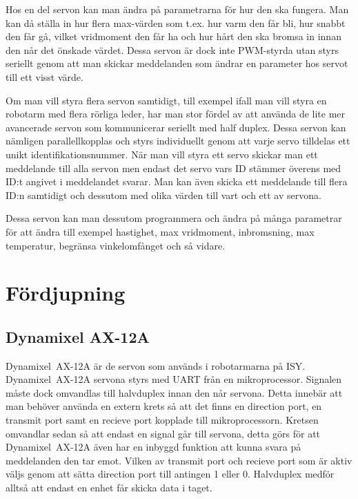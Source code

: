 \documentclass[a4paper,12pt]{article}
\begin{document}
Hos en del servon kan man ändra på parametrarna för hur den ska fungera. Man kan då ställa in hur flera max-värden som t.ex. hur varm den får bli, hur snabbt den får gå, vilket vridmoment den får ha och hur hårt den ska bromsa in innan den når det önskade värdet. Dessa servon är dock inte PWM-styrda utan styrs seriellt genom att man skickar meddelanden som ändrar en parameter hos servot till ett visst värde. 

Om man vill styra flera servon samtidigt, till exempel ifall man vill styra en robotarm med flera rörliga leder, har man stor fördel av att använda de lite mer avancerade servon som kommunicerar seriellt med half duplex. Dessa servon kan nämligen parallellkopplas och styrs individuellt genom att varje servo tilldelas ett unikt identifikationsnummer. När man vill styra ett servo skickar man ett meddelande till alla servon men endast det servo vars ID stämmer överens med ID:t angivet i meddelandet svarar. Man kan även skicka ett meddelande till flera ID:n samtidigt och dessutom med olika värden till vart och ett av servona. 

Dessa servon kan man dessutom programmera och ändra på många parametrar för att ändra till exempel hastighet, max vridmoment, inbromsning, max temperatur, begränsa vinkelomfånget och så vidare.



\section{Fördjupning}

\subsection{Dynamixel AX-12A}

Dynamixel~AX-12A är de servon som används i robotarmarna på ISY. Dynamixel~AX-12A servona styrs med UART från en mikroprocessor. Signalen måste dock omvandlas till halvduplex innan den når servona. Detta innebär att man behöver använda en extern krets så att det finns en direction port, en transmit port samt en recieve port kopplade till mikroprocessorn. Kretsen omvandlar sedan så att endast en signal går till servona, detta görs för att Dynamixel~AX-12A även har en inbyggd funktion att kunna svara på meddelanden den tar emot. Vilken av transmit port och recieve port som är aktiv väljs genom att sätta direction port till antingen 1 eller 0. Halvduplex medför alltså att endast en enhet får skicka data i taget. \cite{dyn-manual}
\end{document}
